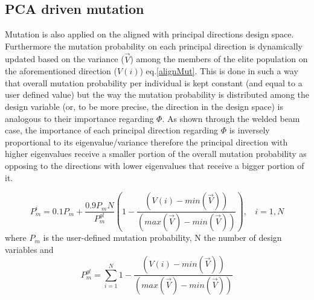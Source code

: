 

\subsection{PCA driven mutation}
Mutation is also applied on the aligned with principal directions design space. Furthermore the mutation probability on each principal direction is dynamically updated based on the variance ($\vec{V}$) among the members of the elite population on the aforementioned direction ($V(i)$) eq.\ref{alignMut}. This is done in such a way that overall mutation probability per individual is kept constant (and equal to a user defined value) but the way the mutation probability is distributed among the design variable (or, to be more precise, the direction in the design space) is analogous to their importance regarding $\Phi$. As shown through the welded beam case, the importance of each principal direction regarding $\Phi$ is inversely proportional to its eigenvalue/variance therefore the principal direction with higher eigenvalues receive a smaller portion of the overall mutation probability as opposing to the directions with lower eigenvalues that receive a bigger portion of it.        

\begin{equation} 
   P_m^{i}=0.1 P_m + \frac{0.9 P_m N}{P_m^{gl}} (1-\frac{(V(i)-min(\vec{V}))}{(max(\vec{V})-min(\vec{V}))}),~~~~i=1,N 
   \label{alignMut} %
\end{equation}
where $P_m$ is the user-defined mutation probability, N the number of design variables and 
\begin{equation} 
   P_m^{gl}=\sum^{N}_{i=1} 1-\frac{(V(i)-min(\vec{V}))}{(max(\vec{V})-min(\vec{V}))}
   \label{alignMut2} %
\end{equation}



